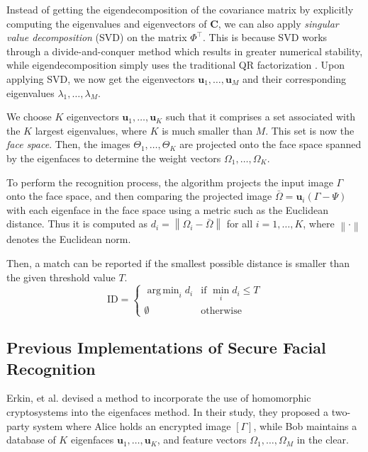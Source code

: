Instead of getting the eigendecomposition of the covariance matrix by explicitly computing the eigenvalues and eigenvectors of $\mathbf{C}$, we can also apply \textit{singular value decomposition} (SVD) on the matrix $\Phi^\top$. This is because SVD works through a divide-and-conquer method which results in greater numerical stability, while eigendecomposition simply uses the traditional QR factorization \cite{nakatsukasa_stable_2013, gu_divide-and-conquer_1995}. Upon applying SVD, we now get the eigenvectors $\mathbf{u}_1, \ldots, \mathbf{u}_M$ and their corresponding eigenvalues $\lambda_1, \ldots, \lambda_M$.

We choose $K$ eigenvectors $\mathbf{u}_1, \ldots, \mathbf{u}_K$ such that it comprises a set associated with the $K$ largest eigenvalues, where $K$ is much smaller than $M$. This set is now the \textit{face space}. Then, the images $\Theta_1, \ldots, \Theta_K$ are projected onto the face space spanned by the eigenfaces to determine the weight vectors $\Omega_1, \ldots, \Omega_K$.

To perform the recognition process, the algorithm projects the input image $\Gamma$ onto the face space, and then comparing the projected image $\bar{\Omega} = \mathbf{u}_i\left(\Gamma - \Psi\right)$ with each eigenface in the face space using a metric such as the Euclidean distance. Thus it is computed as $d_i = \left\lVert \Omega_i -\bar{\Omega} \right\rVert$ for all $i=1,\ldots,K$, where $\left\lVert \cdot \right\rVert$ denotes the Euclidean norm.

Then, a match can be reported if the smallest possible distance is smaller than the given threshold value $T$. 
\newcommand{\argmin}{\mathop{\mathrm{arg\,min}}}  
\begin{equation}
	\text{ID} = \begin{cases}\argmin_i d_i & \text{if } \min_i d_i \le T \\\emptyset & \text {otherwise}\end{cases}
\end{equation}


\subsection{Previous Implementations of Secure Facial Recognition}
Erkin, et al. \cite{hutchison_privacy-preserving_2009} devised a method to incorporate the use of homomorphic cryptosystems into the eigenfaces method. In their study, they proposed a two-party system where Alice holds an encrypted image $\left[\Gamma\right]$, while Bob maintains a database of $K$ eigenfaces $\mathbf{u}_1, \ldots, \mathbf{u}_K$, and feature vectors $\Omega_1, \ldots, \Omega_M$ in the clear.

